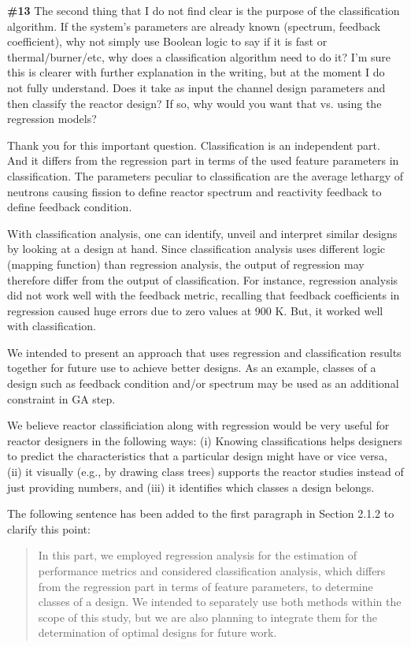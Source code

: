 \documentclass{ar2rc}
\begin{document}
    \Comment \textbf{\#13} The second thing that I do not find clear is the purpose of the
    classification algorithm. If the system's parameters are already known
    (spectrum, feedback coefficient), why not simply use Boolean logic to say
    if it is fast or thermal/burner/etc, why does a classification algorithm
    need to do it? I'm sure this is clearer with further explanation in the
    writing, but at the moment I do not fully understand. Does it take as input
    the channel design parameters and then classify the reactor design? If so,
    why would you want that vs. using the regression models?

    \Response Thank you for this important question. Classification is an independent part. And it differs from the regression part in terms of the used feature parameters in classification. The parameters peculiar to classification are the average lethargy of neutrons causing fission to define reactor spectrum and reactivity feedback to define feedback condition.

    With classification analysis, one can identify, unveil and interpret similar designs by looking at a design at hand. Since classification analysis uses different logic (mapping function) than regression analysis, the output of regression may therefore differ from the output of classification. For instance, regression analysis did not work well with the feedback metric, recalling that feedback coefficients in regression caused huge errors due to zero values at 900 K. But, it worked well with classification.

    We intended to present an approach that uses regression and classification results together for future use to achieve better designs. As an example, classes of a design such as feedback condition and/or spectrum may be used as an additional constraint in GA step.

    We believe reactor classificiation along with regression would be very useful for reactor designers in the following ways: (i) Knowing classifications helps designers to predict the characteristics that a particular design might have or vice versa, (ii) it visually (e.g., by drawing class trees) supports the reactor studies instead of just providing numbers, and (iii) it identifies which classes a design belongs.

    The following sentence has been added to the first paragraph in Section 2.1.2 to clarify this point:\\

    \begin{quote}
        In this part, we employed regression analysis for the estimation of performance metrics and considered classification analysis, which differs from the regression part in terms of feature parameters, to determine classes of a design. We intended to separately use both methods within the scope of this study, but we are also planning to integrate them for the determination of optimal designs for future work.
    \end{quote}
\end{document}
